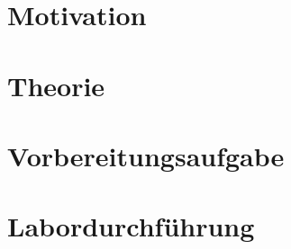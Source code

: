 \section{Motivation}
\begin{quote}
	
	
	
\end{quote} %



\section{Theorie}
\begin{quote}

	
	
	\end{quote}%

\section{Vorbereitungsaufgabe}
\begin{quote}
	
	
	
\end{quote}%


    
\section{Labordurchführung}
\begin{quote}

   

\end{quote}%


    
